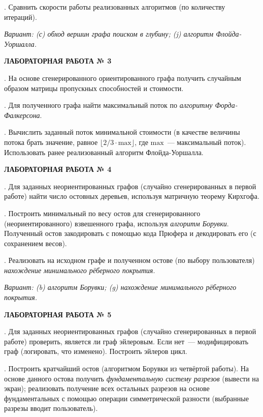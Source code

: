 \documentclass[a4paper,final]{article}
\begin{document}
.\; Сравнить скорости работы реализованных алгоритмов (по количеству итераций).

\noindent\textit{Вариант: (с) обход вершин графа поиском в глубину; (j) алгоритм Флойда-Уоршалла.}

\medskip
\noindent\textbf{ЛАБОРАТОРНАЯ РАБОТА № 3}

.\; На основе сгенерированного ориентированного графа получить случайным образом матрицы пропускных способностей и стоимости.

.\; Для полученного графа найти максимальный поток по \textit{алгоритму Форда-Фалкерсона}.

.\; Вычислить заданный поток минимальной стоимости (в качестве величины потока брать значение, равное $\lfloor 2/3 \cdot \mathrm{max} \rfloor$, где $\mathrm{max}$~--- максимальный поток). Использовать ранее реализованный алгоритм Флойда-Уоршалла.

\medskip
\noindent\textbf{ЛАБОРАТОРНАЯ РАБОТА № 4}

.\; Для заданных неориентированных графов (случайно сгенерированных в первой работе) найти число остовных деревьев, используя матричную теорему Кирхгофа.

.\; Построить минимальный по весу остов для сгенерированного (неориентированного) взвешенного графа, используя \textit{алгоритм Борувки}. Полученный остов закодировать с помощью кода Прюфера и декодировать его (с сохранением весов).

.\; Реализовать на исходном графе и полученном остове (по выбору пользователя) \textit{нахождение минимального рёберного покрытия}.

\noindent\textit{Вариант: (b) алгоритм Борувки; (g) нахождение минимального рёберного покрытия.}

\medskip
\noindent\textbf{ЛАБОРАТОРНАЯ РАБОТА № 5}

.\; Для заданных неориентированных графов (случайно сгенерированных в первой работе) проверить, является ли граф эйлеровым. Если нет~--- модифицировать граф (логировать, что изменено). Построить эйлеров цикл.

.\; Построить кратчайший остов (алгоритмом Борувки из четвёртой работы). На основе данного остова получить \textit{фундаментальную систему разрезов} (вывести на экран); реализовать получение всех остальных разрезов на основе фундаментальных с помощью операции симметрической разности (выбранные разрезы вводит пользователь).
\end{document}
